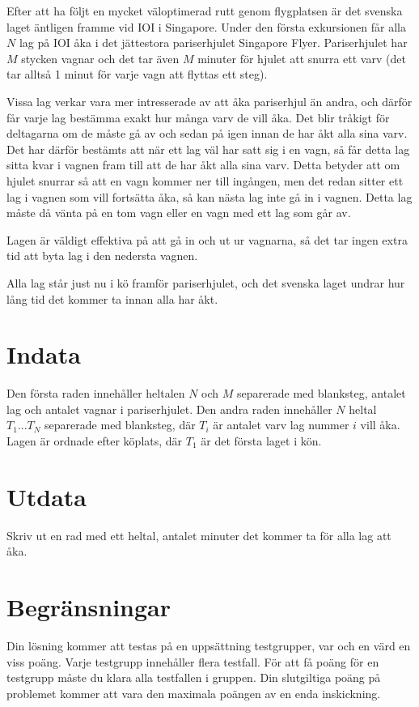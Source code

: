 %
%
Efter att ha följt en mycket väloptimerad rutt genom flygplatsen är det svenska laget äntligen framme vid IOI i Singapore.
Under den första exkursionen får alla $N$ lag på IOI åka i det jättestora pariserhjulet Singapore Flyer.
Pariserhjulet har $M$ stycken vagnar och det tar även $M$ minuter för hjulet att snurra ett varv
(det tar alltså 1 minut för varje vagn att flyttas ett steg).

Vissa lag verkar vara mer intresserade av att åka pariserhjul än andra, och därför får varje lag bestämma exakt hur många varv de vill åka.
Det blir tråkigt för deltagarna om de måste gå av och sedan på igen innan de har åkt alla sina varv.
Det har därför bestämts att när ett lag väl har satt sig i en vagn, så får detta lag sitta kvar i vagnen fram till att de har åkt alla sina varv.
Detta betyder att om hjulet snurrar så att en vagn kommer ner till ingången, men det redan sitter ett lag i vagnen som vill fortsätta åka,
så kan nästa lag inte gå in i vagnen. Detta lag måste då vänta på en tom vagn eller en vagn med ett lag som går av.

Lagen är väldigt effektiva på att gå in och ut ur vagnarna, så det tar ingen extra tid att byta lag i den nedersta vagnen.

Alla lag står just nu i kö framför pariserhjulet, och det svenska laget undrar hur lång tid det kommer ta innan alla har åkt.

\section*{Indata}
Den första raden innehåller heltalen $N$ och $M$ separerade med blanksteg,
antalet lag och antalet vagnar i pariserhjulet.
Den andra raden innehåller $N$ heltal $T_1 ... T_N$ separerade med blanksteg,
där $T_i$ är antalet varv lag nummer $i$ vill åka. Lagen är ordnade efter
köplats, där $T_1$ är det första laget i kön.

\section*{Utdata}
Skriv ut en rad med ett heltal, antalet minuter det kommer ta för alla lag att åka.

\section*{Begränsningar}
Din lösning kommer att testas på en uppsättning testgrupper, var och en värd en viss poäng.
Varje testgrupp innehåller flera testfall.
För att få poäng för en testgrupp måste du klara alla testfallen i gruppen.
Din slutgiltiga poäng på problemet kommer att vara den maximala poängen av en enda inskickning.

